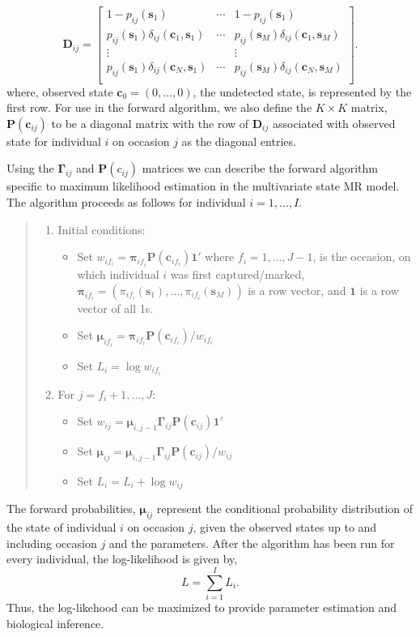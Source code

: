 \documentclass[fleqn]{article}
\newcommand{\bs}{\ensuremath{\mathbf{s}}}
\newcommand{\bc}{\ensuremath{\mathbf{c}}}
\newcommand{\bG}{\ensuremath{\boldsymbol{\Gamma}}}
\newcommand{\bD}{\ensuremath{\mathbf{D}}}
\newcommand{\bP}{\ensuremath{\mathbf{P}}}
\begin{document}
\begin{equation}
\bD_{ij} = \left[
\begin{array}{ccc}
1 - p_{ij}(\bs_1) & \cdots & 1 - p_{ij}(\bs_1) \\
p_{ij}(\bs_1)\delta_{ij}(\bc_1,\bs_1) & \cdots & p_{ij}(\bs_M)\delta_{ij}(\bc_1,\bs_M)\\
\vdots & & \vdots \\
p_{ij}(\bs_1)\delta_{ij}(\bc_N,\bs_1) & \cdots & p_{ij}(\bs_M)\delta_{ij}(\bc_N,\bs_M)\\
\end{array}
\right].
\end{equation}
where, observed state $\bc_0 = (0,\dots,0)$, the undetected state, is represented by the first row.
For use in the forward algorithm, we also define the $K\times K$ matrix, $\bP(\bc_{ij})$ to be a diagonal matrix with the row of $\bD_{ij}$ associated with observed state for individual $i$ on occasion $j$ as the diagonal entries.

Using the $\bG_{ij}$ and $\bP(c_{ij})$ matrices we can describe the forward algorithm specific to maximum likelihood estimation in the multivariate state MR model. The algorithm proceeds as follows for individual $i=1,\dots,I$.
\begin{quote}
\begin{enumerate}
\item Initial conditions:
\begin{itemize}
\item Set $w_{if_i} = \boldsymbol{\pi}_{if_i}\bP(\bc_{if_i})\mathbf{1}'$ where $f_i=1,\dots,J-1$, is the occasion, on which individual $i$ was first captured/marked, $\boldsymbol{\pi}_{if_i} = (\pi_{if_i}(\bs_1),\dots,\pi_{if_i}(\bs_M))$ is a row vector, and $\mathbf{1}$ is a row vector of all 1s.
\item Set $\boldsymbol{\mu}_{if_i} = \boldsymbol{\pi}_{if_i}\bP(\bc_{if_i})/w_{if_i}$
\item Set $L_{i} = \log w_{if_i}$
\end{itemize}
\item For $j=f_i+1,\dots,J$:
\begin{itemize}
\item Set $w_{ij} = \boldsymbol{\mu}_{i,j-1}\bG_{ij}\bP(\bc_{ij})\mathbf{1}'$
\item Set $\boldsymbol{\mu}_{ij} = \boldsymbol{\mu}_{i,j-1}\bG_{ij}\bP(\bc_{ij})/w_{ij}$
\item Set $L_i = L_i + \log w_{ij}$
\end{itemize}
\end{enumerate}
\end{quote}
The forward probabilities, $\boldsymbol{\mu}_{ij}$ represent the conditional probability distribution of the state of individual $i$ on occasion $j$, given the observed states up to and including occasion $j$ and the parameters. After the algorithm has been run for every individual, the log-likelihood is given by,
\begin{equation}
L = \sum_{i=1}^I L_i.
\end{equation}
Thus, the log-likehood can be maximized to provide parameter estimation and biological inference. 
\end{document}
